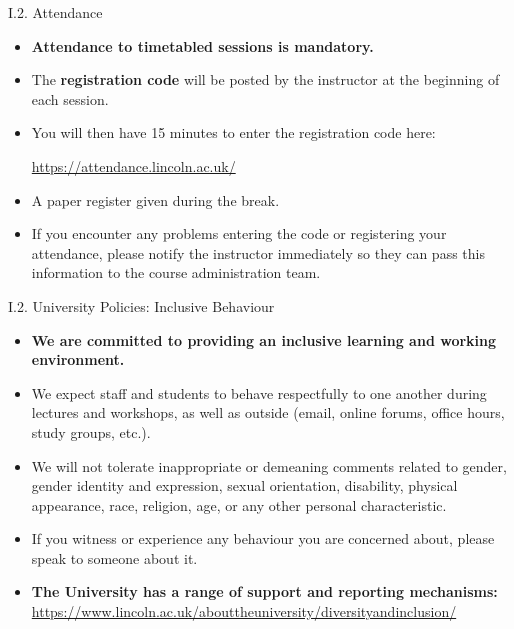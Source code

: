 \documentclass[handout]{beamer}
\newcommand{\strong}[1]{\textbf{\color{teal} #1}}
\newcommand{\stronger}[1]{\textbf{\color{purple} #1}}
\begin{document}
\begin{frame}{I.2. Attendance}
\begin{itemize}
\item \stronger{Attendance to timetabled sessions is mandatory.}
\item The \strong{registration code} will be posted by the instructor at the beginning of each session. 
\item You will then have 15 minutes to enter the registration code here:
\begin{center}
\url{https://attendance.lincoln.ac.uk/}
\end{center}
\item A paper register given during the break. 
\item If you encounter any problems entering the code or registering your attendance, please notify the instructor immediately so they can pass this information to the course administration team.
\end{itemize}
\end{frame}
\begin{frame}{I.2. University Policies: Inclusive Behaviour}
\begin{itemize}
\item \stronger{We are committed to providing an inclusive learning and working environment.}
\item We expect staff and students to behave respectfully to one another during lectures and workshops, as well as outside (email, online forums, office hours, study groups, etc.).
\item We will not tolerate inappropriate or demeaning comments related to gender, gender identity and expression, sexual orientation, disability, physical appearance, race, religion, age, or any other personal characteristic.
\item If you witness or experience any behaviour you are concerned about, please speak to someone about it.
\item \strong{The University has a range of support and reporting mechanisms:}
\url{https://www.lincoln.ac.uk/abouttheuniversity/diversityandinclusion/}
\end{itemize}
\end{frame}
\end{document}
